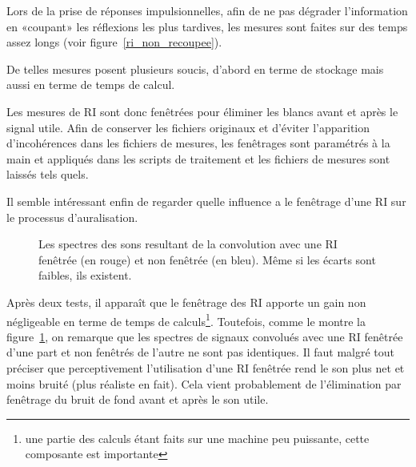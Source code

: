 Lors de la prise de réponses impulsionnelles, afin de ne pas dégrader l'information en «coupant» les réflexions les plus
tardives, les mesures sont faites sur des temps assez longs (voir figure~\ref{ri_non_recoupee}).

De telles mesures posent plusieurs soucis, d'abord en terme de stockage mais aussi en terme de temps de calcul.

Les mesures de RI sont donc fenêtrées pour éliminer les blancs avant et après le signal utile. Afin de conserver les
fichiers originaux et d'éviter l'apparition d'incohérences dans les fichiers de mesures, les fenêtrages sont paramétrés
à la main et appliqués dans les scripts de traitement et les fichiers de mesures sont laissés tels quels.

Il semble intéressant enfin de regarder quelle influence a le fenêtrage d'une RI sur le processus d'auralisation.

\begin{figure}[h!]
\caption{\label{spectres_recoupage}Les spectres des sons resultant de la convolution avec une RI fenêtrée (en rouge) et
non fenêtrée (en bleu). Même si les écarts sont faibles, ils existent.}
\end{figure}

Après deux tests, il apparaît que le fenêtrage des RI apporte un gain non négligeable en terme de temps de
calculs\footnote{une partie des calculs étant faits sur une machine peu puissante, cette composante est importante}.
Toutefois, comme le montre la figure~\ref{spectres_recoupage}, on remarque que les spectres de signaux convolués avec
une RI fenêtrée d'une part et non fenêtrés de l'autre ne sont pas identiques. Il faut malgré tout préciser que
perceptivement l'utilisation d'une RI fenêtrée rend le son plus net et moins bruité (plus réaliste en fait). Cela vient
probablement de l'élimination par fenêtrage du bruit de fond avant et après le son utile.


